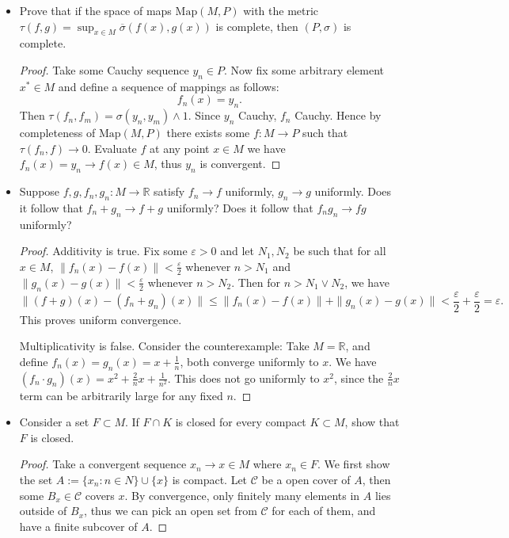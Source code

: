 \begin{itemize}
\item Prove that if the space of maps $\text{Map}(M, P)$ with the metric $\tau(f, g) = \operatorname{sup}_{x \in M} \overline{\sigma} \left( f(x), g(x) \right) $ is complete, then $(P, \sigma)$ is complete.
\begin{proof}
	Take some Cauchy sequence $y_n  \in P$. Now fix some arbitrary element $x^* \in M$ and define a sequence of mappings as follows:
	\[
		f_n(x) = y_n
	.\] 
	Then $\tau(f_n, f_m) = \sigma(y_n, y_m) \wedge 1$. Since $y_n$ Cauchy, $f_n$ Cauchy. Hence by completeness of $\text{Map}(M, P)$ there exists some $f: M \to  P $ such that $\tau(f_n, f) \to  0$. Evaluate $f$ at any point $x \in M$ we have $f_n(x) = y_n \to f(x) \in M$, thus $y_n$ is convergent. 
\end{proof}
\item Suppose $f, g, f_n, g_n: M \to  \mathbb{R}$ satisfy $f_n \to  f$ uniformly, $g_n \to  g$ uniformly. Does it follow that $f_n + g_n \to  f + g$ uniformly? Does it follow that $f_n g_n \to  fg $ uniformly?
\begin{proof}
	Additivity is true. Fix some $\varepsilon > 0$ and let $N_1, N_2$ be such that for all $x \in M$, $\|f_n(x) - f(x)\|< \frac{\varepsilon}{2}$ whenever $n > N_1$ and $\|g_n(x) - g(x)\|< \frac{\varepsilon}{2}$ whenever $n > N_2$. Then for $n > N_1 \vee N_2$, we have
	\[
		\|(f+g)(x) - (f_n + g_n)(x)\|\le \|f_n(x) - f(x)\|+\|g_n(x) - g(x)\| <\frac{\varepsilon}{2} + \frac{\varepsilon}{2} = \varepsilon
	.\] 
	This proves uniform convergence.

Multiplicativity is false. Consider the counterexample: Take $M = \mathbb{R}$, and define $f_n(x) = g_n(x) = x + \frac{1}{n}$, both converge uniformly to $x$. We have $(f_n\cdot g_n)(x) = x^2 + \frac{2}{n} x + \frac{1}{n^2}$. This does not go uniformly to $x^2$, since the $\frac{2}{n} x$ term can be arbitrarily large for any fixed $n$.
\end{proof}
\item Consider a set $F \subset M$. If $F \cap K$ is closed for every compact $K \subset M$, show that $F $ is closed.
\begin{proof}
	Take a convergent sequence $x_n \to  x \in M$ where $x_n \in F$. We first show the set $A:=\{x_n: n \in N\} \cup \{x\} $ is compact. Let $\mathcal{C}$ be a open cover of $A$, then some $B_x \in \mathcal{C}$ covers $x$. By convergence, only finitely many elements in $A$ lies outside of $B_x$, thus we can pick an open set from $\mathcal{C}$ for each of them, and have a finite subcover of $A$.


\end{proof}
\end{itemize}
